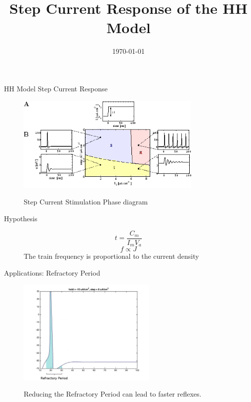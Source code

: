 \documentclass{beamer}
\title[A Constant Current Applied to the HH Model Produces a Train of Action Potentials.]{Step Current Response of the HH Model}
\author[E.Ioannidis \& J.Hobin] {\
   \texorpdfstring{\
        \begin{columns}
            \column{.45\linewidth}
            \centering
            Eleftherios Ioannidis\\
            \href{mailto:elefthei@mit.edu}{elefthei@mit.edu}
            \column{.45\linewidth}
            \centering
            James Hobin\\
            \href{mailto:hobinjk@mit.edu}{hobinjk@mit.edu}
        \end{columns}
   }
   {Eleftherios Ioannidis \& James Hobin}
}
\institute{MIT EECS}
\date{\today}
\begin{document}
\begin{frame}
  \titlepage{}
\end{frame}

\begin{frame}{HH Model Step Current Response}
  \begin{figure}
    \centering
    \includegraphics[width = 0.8\textwidth]{./pictures/gerstner.png}

    Step Current Stimulation Phase diagram
  \end{figure}
\end{frame}

\begin{frame}{Hypothesis}
  \begin{figure}
    \centering
    \[t = \frac{C_m}{I_m V_a}\] %
    \[f \propto J\] %
    The train frequency is proportional to the current density
  \end{figure}
\end{frame}

\begin{frame}{Applications: Refractory Period}
  \begin{figure}
    \centering
    \includegraphics[width = 0.6\textwidth]{./pictures/refractory.jpg}

    Reducing the Refractory Period can lead to faster reflexes.
  \end{figure}
\end{frame}
\end{document}
